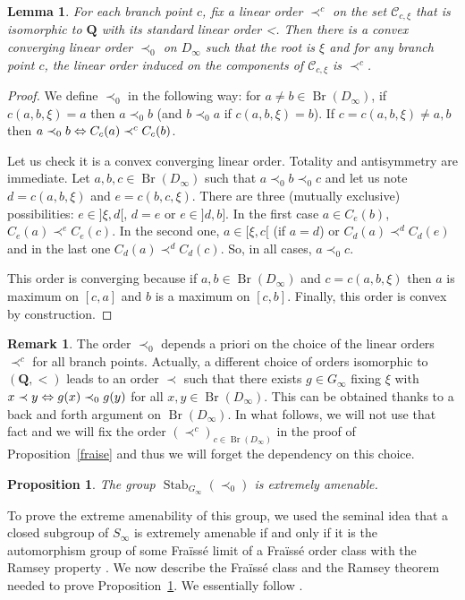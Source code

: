 \documentclass[JEP,XML,SOM,Unicode,NoFloatCountersInSection]{cedram}
\newcommand\ssi{\mathchoice{\iff}{\Leftrightarrow}{\Leftrightarrow}{\Leftrightarrow}}
\let\mathcal\mathscr
\theoremstyle{plain}
\newtheorem{lem}[thm]{Lemma}
\newtheorem{prop}[thm]{Proposition}
\theoremstyle{definition}
\newtheorem{rem}[thm]{Remark}
\newcommand{\QQ}{\mathbf{Q}}
\newcommand{\cC}{\mathcal{C}}
\DeclareMathOperator{\Br}{Br}
\DeclareMathOperator{\Stab}{Stab}
\begin{document}
\begin{lem}\label{cclo} For each branch point $c$, fix a linear order $\prec^c$ on the set $\cC_{c,\xi}$ that is isomorphic to $\QQ$ with its standard linear order <. Then there is a convex converging linear order $\prec _0$ on $D_\infty$ such that the root is $\xi$ and for any branch point $c$, the linear order induced on the components of $\cC_{c,\xi}$ is $\prec^c$.
\end{lem}
\begin{proof} We define $\prec_0$ in the following way: for $a\neq b\in\Br(D_\infty)$, if $c(a,b,\xi)=a$ then $a\prec_0 b$ (and $b\prec_0 a$ if $c(a,b,\xi)=b$). If $c=c(a,b,\xi)\neq a,b$ then $a\prec_0b\ssi C_c(a)\prec^c C_c(b)$.

Let us check it is a convex converging linear order. Totality and antisymmetry are immediate. Let $a,b,c\in\Br(D_\infty)$ such that $a\prec_0 b\prec_0 c$ and let us note $d=c(a,b,\xi)$ and $e=c(b,c,\xi)$. There are three (mutually exclusive) possibilities: $e\in{}]\xi,d[$, $d=e$ or $e\in{}]d,b]$. In the first case $a\in C_e(b)$, $C_e(a)\prec^e C_e(c)$. In the second one, $a\in[\xi,c[$ (if $a=d$) or $C_d(a)\prec^d C_d(e)$ and in the last one $C_d(a)\prec^d C_d(c)$. So, in all cases, $a\prec_0 c$.

This order is converging because if $a,b\in\Br(D_\infty)$ and $c=c(a,b,\xi)$ then $a$ is maximum on $[c,a]$ and $b$ is a maximum on $[c,b]$. Finally, this order is convex by construction.
\end{proof}

\begin{rem}The order $\prec_0$ depends a priori on the choice of the linear orders $\prec^c$ for all branch points. Actually, a different choice of orders isomorphic to $(\QQ,<)$ leads to an order $\prec$ such that there exists $g\in G_\infty$ fixing $\xi$ with $x\prec y\ssi g(x)\prec_0 g(y)$ for all $x,y\in\Br(D_\infty)$. This can be obtained thanks to a back and forth argument on $\Br(D_\infty)$. In what follows, we will not use that fact and we will fix the order $(\prec^c)_{c\in\Br(D_\infty)}$ in the proof of Proposition~\ref{fraise} and thus we will forget the dependency on this choice.\end{rem}

\begin{prop}\label{Ramsey} The group $\Stab_{G_\infty}(\prec _0)$ is extremely amenable.
\end{prop}

To prove the extreme amenability of this group, we used the seminal idea that a closed subgroup of $S_\infty$ is extremely amenable if and only if it is the automorphism group of some Fraïssé limit of a Fraïssé order class with the Ramsey property \cite[Th.\,4.7]{MR2140630}. We now describe the Fraïssé class and the Ramsey theorem needed to prove Proposition~\ref{Ramsey}. We essentially follow \cite{MR3436366}.
\end{document}
